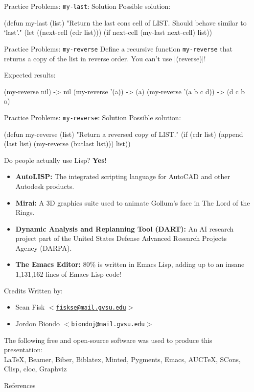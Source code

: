 \documentclass{beamer}
\newcommand{\mailtohref}[1]{\href{mailto:#1}{$<$\nolinkurl{#1}$>$}}
\begin{document}

\begin{frame}[fragile]{Practice Problems: \texttt{my-last}: Solution}
  Possible solution:
  \begin{clcode}
(defun my-last (list)
  "Return the last cons cell of LIST.
Should behave similar to `last'."
  (let ((next-cell (cdr list)))
    (if next-cell
        (my-last next-cell)
      list))
  \end{clcode}
\end{frame}

\begin{frame}[fragile]{Practice Problems: \texttt{my-reverse}}
  Define a recursive function \texttt{my-reverse} that returns a copy
  of the list in reverse order. You can't use \cl|(reverse)|!

Expected results:
\begin{clcode}
  (my-reverse nil) -> nil
  (my-reverse '(a)) -> (a)
  (my-reverse '(a b c d)) -> (d c b a)
\end{clcode}
\end{frame}

\begin{frame}[fragile]{Practice Problems: \texttt{my-reverse}: Solution}
  Possible solution:
  \begin{clcode}
(defun my-reverse (list)
  "Return a reversed copy of LIST."
  (if (cdr list)
      (append (last list) (my-reverse (butlast list)))
    list))
  \end{clcode}
\end{frame}

\begin{frame}{Do people actually use Lisp?}
  \textbf{Yes!}
  \begin{itemize}
  \item \textbf{AutoLISP:} The integrated scripting language for AutoCAD and
    other Autodesk products.
  \item \textbf{Mirai:} A 3D graphics suite used to animate Gollum's face in The Lord of the Rings.
  \item \textbf{Dynamic Analysis and Replanning Tool (DART):} An AI research
    project part of the United States Defense Advanced Research
    Projects Agency (DARPA).
  \item \textbf{The Emacs Editor:} 80\% is written in Emacs Lisp,
    adding up to an insane 1,131,162 lines of Emacs Lisp code!
  \end{itemize}
\end{frame}

\begin{frame}{Credits}
  Written by:
  \begin{itemize}
  \item Sean Fisk \mailtohref{fiskse@mail.gvsu.edu}
  \item Jordon Biondo \mailtohref{biondoj@mail.gvsu.edu}
  \end{itemize}
  The following free and open-source software was used to produce this presentation: \\
  \LaTeX, Beamer, Biber, Biblatex, Minted, Pygments, Emacs, AUCTeX, SCons, Clisp, cloc, Graphviz
\end{frame}
\begin{frame}{References}
  \printbibliography
\end{frame}
\end{document}

